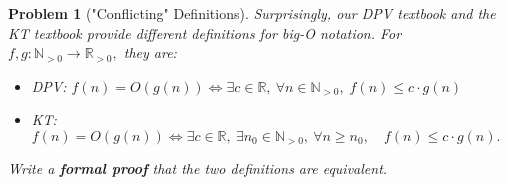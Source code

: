 \documentclass[10pt]{article}
\newtheorem{problem}{\sc\color{cit}Problem}
\begin{document}
\newpage





\begin{problem}["Conflicting" Definitions]
Surprisingly, our DPV textbook and the KT textbook provide different definitions for big-O notation. For $f,g: \mathbb{N}_{>0} \to \mathbb{R}_{> 0},$ they are:
\begin{itemize}
    \item DPV: $f(n) = O(g(n)) \iff \exists c \in \mathbb{R}, \: \forall n \in \mathbb{N}_{>0},\;  f(n) \leq c \cdot g(n)$ 
    \item KT: $f(n) = O(g(n)) \iff \exists c \in \mathbb{R}, \: \exists n_0 \in \mathbb{N}_{>0}, \: \forall n \geq n_0, \quad f(n) \leq c \cdot g(n).$
\end{itemize}
Write a \textbf{formal proof} that the two definitions are equivalent.

\end{problem}
\end{document}
